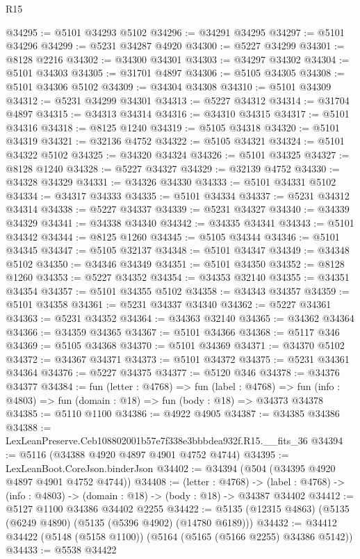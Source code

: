 \begin{lexlean}{R15}
\begin{coremodule}
{{{{{{{{{{{@34295 := @5101 @34293 @5102
@34296 := @34291 @34295
@34297 := @5101 @34296
@34299 := @5231 @34287 @4920
@34300 := @5227 @34299
@34301 := @8128 @2216
@34302 := @34300 @34301
@34303 := @34297 @34302
@34304 := @5101 @34303
@34305 := @31701 @4897
@34306 := @5105 @34305
@34308 := @5101 @34306 @5102
@34309 := @34304 @34308
@34310 := @5101 @34309
@34312 := @5231 @34299 @34301
@34313 := @5227 @34312
@34314 := @31704 @4897
@34315 := @34313 @34314
@34316 := @34310 @34315
@34317 := @5101 @34316
@34318 := @8125 @1240
@34319 := @5105 @34318
@34320 := @5101 @34319
@34321 := @32136 @4752
@34322 := @5105 @34321
@34324 := @5101 @34322 @5102
@34325 := @34320 @34324
@34326 := @5101 @34325
@34327 := @8128 @1240
@34328 := @5227 @34327
@34329 := @32139 @4752
@34330 := @34328 @34329
@34331 := @34326 @34330
@34333 := @5101 @34331 @5102
@34334 := @34317 @34333
@34335 := @5101 @34334
@34337 := @5231 @34312 @34314
@34338 := @5227 @34337
@34339 := @5231 @34327
@34340 := @34339 @34329
@34341 := @34338 @34340
@34342 := @34335 @34341
@34343 := @5101 @34342
@34344 := @8125 @1260
@34345 := @5105 @34344
@34346 := @5101 @34345
@34347 := @5105 @32137
@34348 := @5101 @34347
@34349 := @34348 @5102
@34350 := @34346 @34349
@34351 := @5101 @34350
@34352 := @8128 @1260
@34353 := @5227 @34352
@34354 := @34353 @32140
@34355 := @34351 @34354
@34357 := @5101 @34355 @5102
@34358 := @34343 @34357
@34359 := @5101 @34358
@34361 := @5231 @34337 @34340
@34362 := @5227 @34361
@34363 := @5231 @34352
@34364 := @34363 @32140
@34365 := @34362 @34364
@34366 := @34359 @34365
@34367 := @5101 @34366
@34368 := @5117 @346
@34369 := @5105 @34368
@34370 := @5101 @34369
@34371 := @34370 @5102
@34372 := @34367 @34371
@34373 := @5101 @34372
@34375 := @5231 @34361 @34364
@34376 := @5227 @34375
@34377 := @5120 @346
@34378 := @34376 @34377
@34384 := fun (letter : @4768) =>
  fun (label : @4768) =>
  fun (info : @4803) => fun (domain : @18) => fun (body : @18) => @34373 @34378
@34385 := @5110 @1100
@34386 := @4922 @4905
@34387 := @34385 @34386
@34388 := LexLeanPreserve.Ceb108802001b57e7f338e3bbbdea932f.R15.__fits_36
@34394 := @5116 (@34388 @4920 @4897 @4901 @4752 @4744)
@34395 := LexLeanBoot.CoreJson.binderJson
@34402 := @34394 (@504 (@34395 @4920 @4897 @4901 @4752 @4744))
@34408 := (letter : @4768) ->
  (label : @4768) -> (info : @4803) -> (domain : @18) -> (body : @18) -> @34387 @34402
@34412 := @5127 @1100 @34386 @34402 @2255
@34422 := @5135 (@12315 @4863) (@5135 (@6249 @4890) (@5135 (@5396 @4902) (@14780 @6189)))
@34432 := @34412 @34422 (@5148 (@5158 @1100)) (@5164 (@5165 (@5166 @2255) @34386 @5142))
@34433 := @5538 @34422
}}}}}}}}}}}
\end{coremodule}
\end{lexlean}

